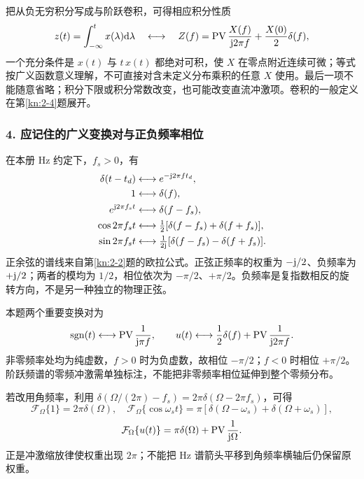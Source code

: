 把从负无穷积分写成与阶跃卷积，可得相应积分性质
\[
z(t)=\int_{-\infty}^{t}x(\lambda)\mathrm{d}\lambda
\quad\longleftrightarrow\quad
Z(f)=\operatorname{PV}\frac{X(f)}{\mathrm{j}2\pi f}+\frac{X(0)}2\delta(f),
\]
一个充分条件是 $x(t)$ 与 $t\,x(t)$ 都绝对可积，使 $X$ 在零点附近连续可微；等式按广义函数意义理解，不可直接对含未定义分布乘积的任意 $X$ 使用。最后一项不能随意省略；积分下限或积分常数改变，也可能改变直流冲激项。卷积的一般定义在第\ref{kn:2-4}题展开。

\subsubsection*{4. 应记住的广义变换对与正负频率相位}
在本册 Hz 约定下，$f_s>0$，有
\begin{align*}
\delta(t-t_d)&\longleftrightarrow e^{-\mathrm{j}2\pi ft_d},\\
1&\longleftrightarrow\delta(f),\\
e^{\mathrm{j}2\pi f_st}&\longleftrightarrow\delta(f-f_s),\\
\cos2\pi f_st&\longleftrightarrow\tfrac12[\delta(f-f_s)+\delta(f+f_s)],\\
\sin2\pi f_st&\longleftrightarrow\tfrac1{2\mathrm{j}}[\delta(f-f_s)-\delta(f+f_s)].
\end{align*}
正余弦的谱线来自第\ref{kn:2-2}题的欧拉公式。正弦正频率的权重为 $-\mathrm{j}/2$、负频率为 $+\mathrm{j}/2$；两者的模均为 $1/2$，相位依次为 $-\pi/2$、$+\pi/2$。负频率是复指数相反的旋转方向，不是另一种独立的物理正弦。

本题两个重要变换对为
\[
\operatorname{sgn}(t)\longleftrightarrow\operatorname{PV}\frac1{\mathrm{j}\pi f},\qquad
u(t)\longleftrightarrow\frac12\delta(f)+\operatorname{PV}\frac1{\mathrm{j}2\pi f}.
\]
非零频率处均为纯虚数，$f>0$ 时为负虚数，故相位 $-\pi/2$；$f<0$ 时相位 $+\pi/2$。阶跃频谱的零频冲激需单独标注，不能把非零频率相位延伸到整个零频分布。

若改用角频率，利用 $\delta(\Omega/(2\pi)-f_s)=2\pi\delta(\Omega-2\pi f_s)$，可得
\[
\mathcal F_\Omega\{1\}=2\pi\delta(\Omega),\quad
\mathcal F_\Omega\{\cos\omega_st\}=\pi[\delta(\Omega-\omega_s)+\delta(\Omega+\omega_s)],
\]
\[
\mathcal F_\Omega\{u(t)\}=\pi\delta(\Omega)+\operatorname{PV}\frac1{\mathrm{j}\Omega}.
\]
正是冲激缩放律使权重出现 $2\pi$；不能把 Hz 谱箭头平移到角频率横轴后仍保留原权重。



